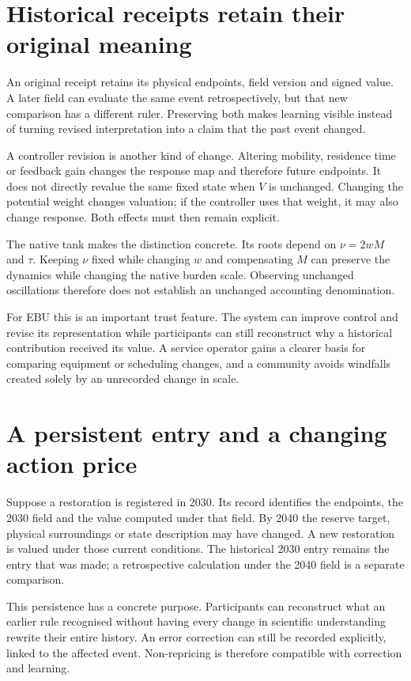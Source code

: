 \section{Historical receipts retain their original meaning}
An original receipt retains its physical endpoints, field version and signed value. A later field can evaluate the same event retrospectively, but that new comparison has a different ruler. Preserving both makes learning visible instead of turning revised interpretation into a claim that the past event changed.

A controller revision is another kind of change. Altering mobility, residence time or feedback gain changes the response map and therefore future endpoints. It does not directly revalue the same fixed state when $V$ is unchanged. Changing the potential weight changes valuation; if the controller uses that weight, it may also change response. Both effects must then remain explicit.

The native tank makes the distinction concrete. Its roots depend on $\nu=2wM$ and $\tau$. Keeping $\nu$ fixed while changing $w$ and compensating $M$ can preserve the dynamics while changing the native burden scale. Observing unchanged oscillations therefore does not establish an unchanged accounting denomination.

For EBU this is an important trust feature. The system can improve control and revise its representation while participants can still reconstruct why a historical contribution received its value. A service operator gains a clearer basis for comparing equipment or scheduling changes, and a community avoids windfalls created solely by an unrecorded change in scale.

\section{A persistent entry and a changing action price}
Suppose a restoration is registered in 2030. Its record identifies the endpoints, the 2030 field and the value computed under that field. By 2040 the reserve target, physical surroundings or state description may have changed. A new restoration is valued under those current conditions. The historical 2030 entry remains the entry that was made; a retrospective calculation under the 2040 field is a separate comparison.

This persistence has a concrete purpose. Participants can reconstruct what an earlier rule recognised without having every change in scientific understanding rewrite their entire history. An error correction can still be recorded explicitly, linked to the affected event. Non-repricing is therefore compatible with correction and learning.

